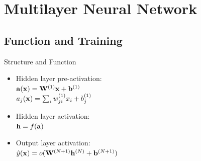   
\section{Multilayer Neural Network}%
	\subsection{Function and Training}		
	\begin{frame}[t]{Structure and Function}
	  \begin{minipage}{0.45\linewidth}
	      \begin{itemize}
	       \itemsep10pt
	       \item Hidden layer pre-activation:\\
	       $\mathbf{a}(\mathbf{x}) =\mathbf{W}^{(1)}\mathbf{x} + \mathbf{b}^{(1)}$\\
	       $a_{j}(\mathbf{x}) = \sum_i w_{ji}^{(1)}x_{i} + b_{j}^{(1)}$
	       \item Hidden layer activation:\\
	       $\mathbf{h} = f(\mathbf{a})$
	       \item Output layer activation:\\
	       $\hat{y}(\mathbf{x}) = o(\mathbf{W}^{(N+1)}\mathbf{h}^{(N)} + \mathbf{b}^{(N+1)} )$
	      \end{itemize}
	  \end{minipage}
	  

	\end{frame}
	
